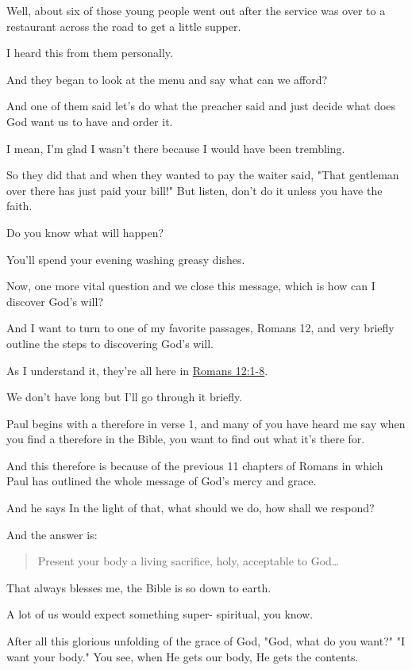 \documentclass[11pt]{article}
\begin{document}
Well, about six of those young people went out
after the service was over to a restaurant
across the road to get a little supper.

I heard this from them personally.

And they began to look at the menu and say
what can we afford?

And one of them said let's do what the
preacher said and just decide what does God
want us to have and order it.

I mean, I'm glad I wasn't there because I
would have been trembling.

So they did that and when they wanted to pay
the waiter said, "That gentleman over there
has just paid your bill!" But listen, don't do
it unless you have the faith.

Do you know what will happen?

You'll spend your evening washing greasy
dishes.

Now, one more vital question and we close this
message, which is how can I discover God's
will?

And I want to turn to one of my favorite
passages, Romans 12, and very briefly outline
the steps to discovering God's will.

As I understand it, they're all here in \href{https://www.biblegateway.com/passage/?search=Romans\%2012\%3A1-8\&version=ESV}{Romans 12:1-8}.

We don't have long but I'll go through it
briefly.

Paul begins with a therefore in verse 1, and
many of you have heard me say when you find a
therefore in the Bible, you want to find out
what it's there for.

And this therefore is because of the previous
11 chapters of Romans in which Paul has
outlined the whole message of God's mercy and
grace.

And he says In the light of that, what should
we do, how shall we respond?

And the answer is:

\begin{quote}
Present your body a living sacrifice, holy, acceptable to God\ldots{}
\end{quote}

That always blesses me, the Bible is so down
to earth.

A lot of us would expect something super-
spiritual, you know.

After all this glorious unfolding of the grace
of God, "God, what do you want?" "I want your
body." You see, when He gets our body, He gets
the contents.
\end{document}
